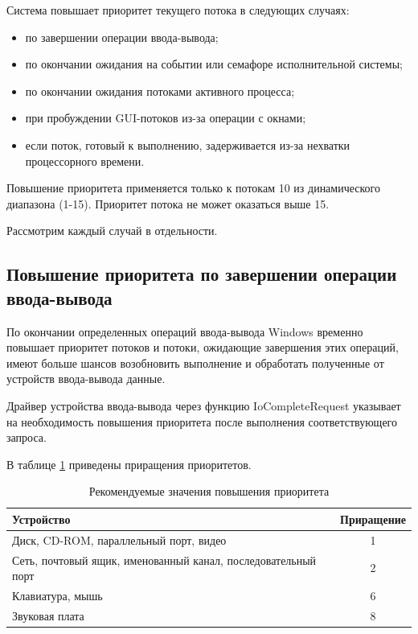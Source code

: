 Система повышает приоритет текущего потока в следующих случаях:

\begin{itemize}
	\item по завершении операции ввода-вывода;
	\item по окончании ожидания на событии или семафоре исполнительной системы;
	\item по окончании ожидания потоками активного процесса;
	\item при пробуждении GUI-потоков из-за операции с окнами;
	\item если поток, готовый к выполнению, задерживается из-за нехватки процессорного времени.
\end{itemize}

Повышение приоритета применяется только к потокам 10 из динамического диапазона (1-15). Приоритет потока не может оказаться выше 15.

Рассмотрим каждый случай в отдельности.

\subsection{Повышение приоритета по завершении операции ввода-вывода}

По окончании определенных операций ввода-вывода Windows временно повышает приоритет потоков и потоки, ожидающие завершения этих операций, имеют больше шансов возобновить выполнение и обработать полученные от устройств ввода-вывода данные.

Драйвер устройства ввода-вывода через функцию IoCompleteRequest указывает на необходимость повышения приоритета после выполнения соответствующего запроса.

В таблице \ref{table:3} приведены приращения приоритетов.

\begin{table}
	\begin{center}
		\caption{Рекомендуемые значения повышения приоритета}
		\begin{tabular}{|l|c|}
			\hline
			\textbf{Устройство} & \textbf{Приращение }\\
			\hline
			Диск, CD-ROM, параллельный порт, видео & 1 \\
			\hline
			Сеть, почтовый ящик, именованный канал, последовательный порт & 2 \\
			\hline
			Клавиатура, мышь & 6 \\
			\hline
			Звуковая плата & 8 \\
			\hline
		\end{tabular}
		\label{table:3}
	\end{center}
\end{table}

